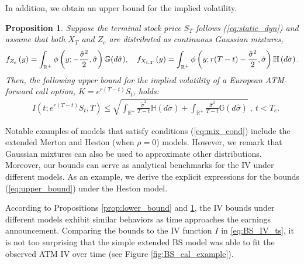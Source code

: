 \documentclass[11pt]{article}
\newtheorem{prop}[theorem]{Proposition}
\numberwithin{equation}{section}
\numberwithin{theorem}{section}
\def\G{\mathbb{G}}
\def\H{\mathbb{H}}
\begin{document}
%

In addition, we obtain an upper bound for the implied volatility.
\begin{prop}
\label{prop:upper_bound}Suppose the terminal stock price $S_T$ follows (\ref{eq:static_dyn}) and
assume that both $X_{T}$ and $Z_{e}$ are distributed as continuous
Gaussian mixtures,
\begin{equation}
f_{Z_{e}}\left(y\right)=\int_{\mathbb{R}^{+}}\phi\left(y;-\frac{\hat{\sigma}^{2}}{2},\hat{\sigma}\right)\G\text{\ensuremath{\left(d\hat{\sigma}\right)}},\quad f_{X_{t,T}}\left(y\right)=\int_{\mathbb{R}^{+}}\phi\left(y;r(T-t)-\frac{\tilde{\sigma}^{2}}{2},\tilde{\sigma}\right)\H\left(d\tilde{\sigma}\right).\label{eq:mix_cond}
\end{equation}
Then, the following upper bound for the implied volatility of a European
ATM-forward call option, $K=e^{r\left(T-t\right)}S_{t}$, holds:
\begin{align}
 & I\left(t;e^{r\left(T-t\right)}S_{t},T\right)\leq\sqrt{\int_{\mathbb{R}^{+}}\frac{\tilde{\sigma}^{2}}{T-t}\H\left(d\tilde{\sigma}\right)+\int_{\mathbb{R}^{+}}\frac{\hat{\sigma}^{2}}{T-t}\G\left(d\hat{\sigma}\right)}\ ,\ t<T_{e}.\label{eq:upper_bound}
\end{align}
 
\end{prop}

Notable examples of models that satisfy conditions (\ref{eq:mix_cond}) include the extended Merton and Heston (when $\rho=0$) models. However, we remark that  Gaussian mixtures can also be used to approximate other distributions. Moreover, our bounds can serve as analytical benchmarks for the IV under different models. As an example, we derive the explicit  expressions for
the bounds (\ref{eq:upper_bound}) under the Heston model.

According to Propositions \ref{prop:lower_bound} and \ref{prop:upper_bound},   the IV bounds  under different models exhibit similar   behaviors as time approaches the earnings announcement. Comparing the bounds to the IV function $I$ in \eqref{eq:BS_IV_ts}, it is not too surprising that  the simple extended  BS model was able to fit the observed ATM IV over time  (see Figure \ref{fig:BS_cal_example}). 
\end{document}

